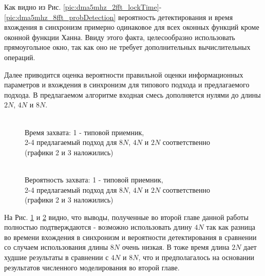 Как видно из Рис. \ref{pic:dma5mhz_2fft_lockTime}-  \ref{pic:dma5mhz_8fft_probDetection} вероятность детектирования и время вхождения в синхронизм примерно одинаковое для всех оконных функций
кроме оконной функции Ханна. Ввиду этого факта, целесообразно использовать прямоугольное окно, так как оно не требует дополнительных вычислительных операций.

Далее приводится оценка вероятности правильной оценки информационных параметров и вхождения в синхронизм для типового подхода и предлагаемого подхода.
В предлагаемом алгоритме входная смесь дополняется нулями до длины ${2N}$, ${4N}$ и ${8N}$.
\begin{figure}[h]
\center{}
	\caption{\\Время захвата: 1 - типовой приемник,\\2-4 предлагаемый подход для ${8N}$, ${4N}$ и ${2N}$ соответственно\\(графики 2 и 3 наложились)}
	\label{pic:dma5mhz_lockTime}
\end{figure}
\begin{figure}[h]
\center{}
	\caption{\\Вероятность захвата: 1 - типовой приемник,\\2-4 предлагаемый подход для ${8N}$, ${4N}$ и ${2N}$ соответственно\\(графики 2 и 3 наложились)}
	\label{pic:dma5mhz_probDetection}
\end{figure}
На Рис. \ref{pic:dma5mhz_lockTime} и \ref{pic:dma5mhz_probDetection} видно, что выводы, полученные во второй главе данной работы полностью подтверждаются - возможно использовать
длину ${4N}$ так как разница во времени вхождения в синхронизм и вероятности детектирования в сравнении со случаем использования длины ${8N}$ очень низкая. В тоже время
длина ${2N}$ дает худшие результаты в сравнении с ${4N}$ и ${8N}$, что и предполагалось на основании результатов численного моделирования во второй главе.


